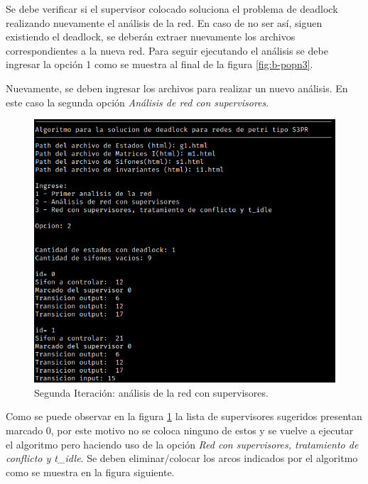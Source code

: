 Se debe verificar si el supervisor colocado soluciona el problema de deadlock realizando nuevamente el análisis de la red. En caso de no ser así, siguen existiendo el deadlock, se deberán extraer nuevamente los archivos correspondientes a la nueva red. Para seguir ejecutando el análisis se debe ingresar la opción 1 como se muestra al final de la figura \ref{fig:b-popn3}. \\
\par
Nuevamente, se deben ingresar los archivos para realizar un nuevo análisis. En este caso la segunda opción \textit{Análisis de red con supervisores}. 
\bigskip

\begin{figure} [H]
    \centering
    \includegraphics[width=\textwidth]{Figures/apendiceB/Py-POPN4.png}
    \caption{Segunda Iteración: análisis de la red con supervisores.}
    \label{fig:b-popn4}
\end{figure}
\bigskip

Como se puede observar en la figura \ref{fig:b-popn4} la lista de supervisores sugeridos presentan marcado 0, por este motivo no se coloca ninguno de estos y se vuelve a ejecutar el algoritmo pero haciendo uso de la opción \textit{Red con supervisores, tratamiento de conflicto y t\_idle}. Se deben eliminar/colocar los arcos indicados por el algoritmo como se muestra en la figura siguiente.


